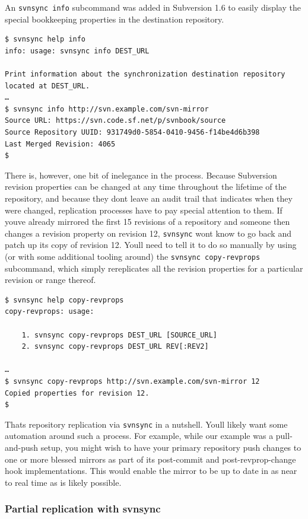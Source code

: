 An \texttt{svnsync\ info} subcommand was added in Subversion 1.6 to
easily display the special bookkeeping properties in the destination
repository.

\begin{verbatim}
$ svnsync help info
info: usage: svnsync info DEST_URL

Print information about the synchronization destination repository
located at DEST_URL.
…
$ svnsync info http://svn.example.com/svn-mirror
Source URL: https://svn.code.sf.net/p/svnbook/source
Source Repository UUID: 931749d0-5854-0410-9456-f14be4d6b398
Last Merged Revision: 4065
$
\end{verbatim}

There is, however, one bit of inelegance in the process. Because
Subversion revision properties can be changed at any time throughout the
lifetime of the repository, and because they don\textquotesingle t leave
an audit trail that indicates when they were changed, replication
processes have to pay special attention to them. If
you\textquotesingle ve already mirrored the first 15 revisions of a
repository and someone then changes a revision property on revision 12,
\texttt{svnsync} won\textquotesingle t know to go back and patch up its
copy of revision 12. You\textquotesingle ll need to tell it to do so
manually by using (or with some additional tooling around) the
\texttt{svnsync\ copy-revprops} subcommand, which simply rereplicates
all the revision properties for a particular revision or range thereof.

\begin{verbatim}
$ svnsync help copy-revprops
copy-revprops: usage:

    1. svnsync copy-revprops DEST_URL [SOURCE_URL]
    2. svnsync copy-revprops DEST_URL REV[:REV2]

…
$ svnsync copy-revprops http://svn.example.com/svn-mirror 12
Copied properties for revision 12.
$
\end{verbatim}

That\textquotesingle s repository replication via \texttt{svnsync} in a
nutshell. You\textquotesingle ll likely want some automation around such
a process. For example, while our example was a pull-and-push setup, you
might wish to have your primary repository push changes to one or more
blessed mirrors as part of its post-commit and post-revprop-change hook
implementations. This would enable the mirror to be up to date in as
near to real time as is likely possible.

\subsubsection{Partial replication with
svnsync}\label{svn.reposadmin.maint.replication.svnsync-partial}

